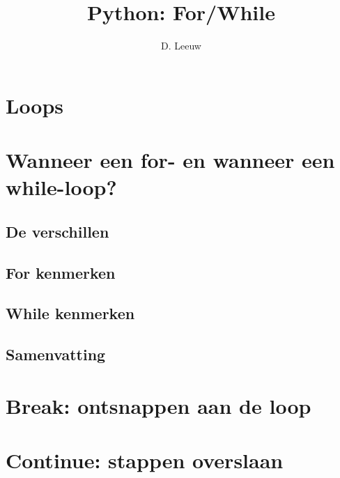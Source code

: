 \documentclass[a4paper,12pt,twoside,openright,titlepage]{article}
\author{D. Leeuw}
\title{Python: For/While}
\date{\today\\
1.0.0\\
\vfill
\raggedright
\copyright\ 2025 Dennis Leeuw\\
}
\begin{document}

\maketitle



\section{Loops}


\section{Wanneer een for- en wanneer een while-loop?}

\subsection{De verschillen}

\subsection{For kenmerken}

\subsection{While kenmerken}

\subsection{Samenvatting}


\section{Break: ontsnappen aan de loop}


\section{Continue: stappen overslaan}


\printindex
\end{document}
